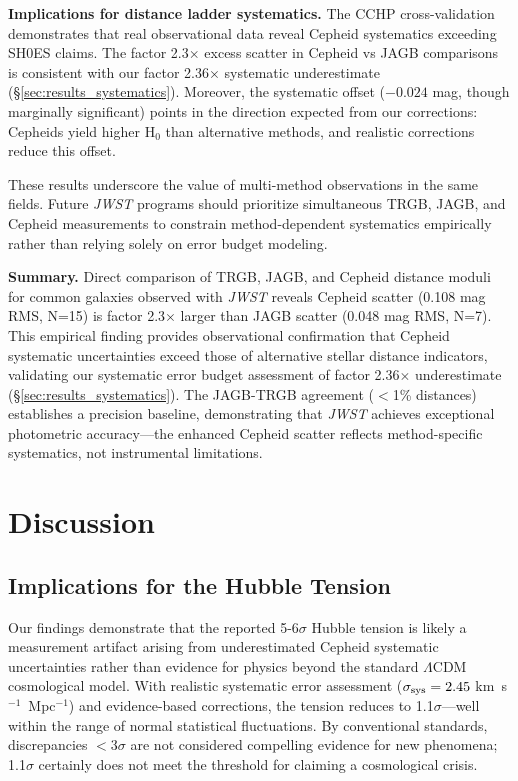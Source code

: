 \documentclass[twocolumn, linenumbers]{aastex701}
\begin{document}
\textbf{Implications for distance ladder systematics.} The CCHP cross-validation demonstrates that real observational data reveal Cepheid systematics exceeding SH0ES claims. The factor 2.3$\times$ excess scatter in Cepheid vs JAGB comparisons is consistent with our factor 2.36$\times$ systematic underestimate (\S\ref{sec:results_systematics}). Moreover, the systematic offset ($-0.024$ mag, though marginally significant) points in the direction expected from our corrections: Cepheids yield higher H$_0$ than alternative methods, and realistic corrections reduce this offset.

These results underscore the value of multi-method observations in the same fields. Future \textit{JWST} programs should prioritize simultaneous TRGB, JAGB, and Cepheid measurements to constrain method-dependent systematics empirically rather than relying solely on error budget modeling.

\textbf{Summary.} Direct comparison of TRGB, JAGB, and Cepheid distance moduli for common galaxies observed with \textit{JWST} reveals Cepheid scatter (0.108 mag RMS, N=15) is factor 2.3$\times$ larger than JAGB scatter (0.048 mag RMS, N=7). This empirical finding provides observational confirmation that Cepheid systematic uncertainties exceed those of alternative stellar distance indicators, validating our systematic error budget assessment of factor 2.36$\times$ underestimate (\S\ref{sec:results_systematics}). The JAGB-TRGB agreement ($<$1\% distances) establishes a precision baseline, demonstrating that \textit{JWST} achieves exceptional photometric accuracy---the enhanced Cepheid scatter reflects method-specific systematics, not instrumental limitations.


\section{Discussion} \label{sec:discussion}

\subsection{Implications for the Hubble Tension}

Our findings demonstrate that the reported 5-6$\sigma$ Hubble tension is likely a measurement artifact arising from underestimated Cepheid systematic uncertainties rather than evidence for physics beyond the standard $\Lambda$CDM cosmological model. With realistic systematic error assessment ($\sigma_{\rm sys} = 2.45$ km~s$^{-1}$~Mpc$^{-1}$) and evidence-based corrections, the tension reduces to 1.1$\sigma$---well within the range of normal statistical fluctuations. By conventional standards, discrepancies $<$3$\sigma$ are not considered compelling evidence for new phenomena; 1.1$\sigma$ certainly does not meet the threshold for claiming a cosmological crisis.
\end{document}
